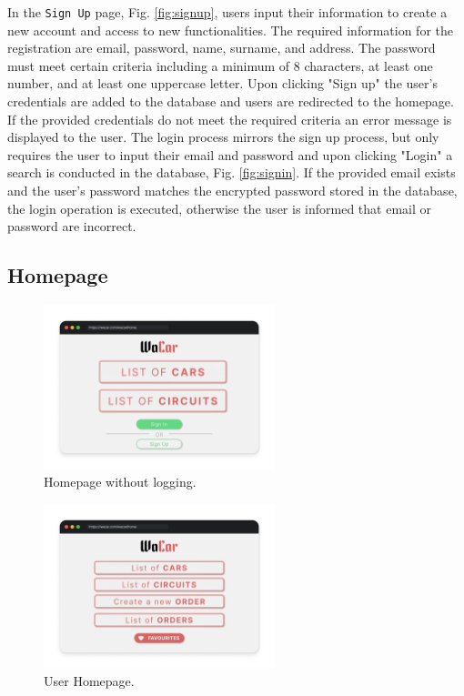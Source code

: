 In the \texttt{Sign Up} page, Fig. \ref{fig:signup}, users input their information to create a new account and access to new functionalities. The required information for the registration are email, password, name, surname, and address. The password must meet certain criteria including a minimum of 8 characters, at least one number, and at least one uppercase letter. Upon clicking "Sign up" the user's credentials are added to the database and users are redirected to the homepage. If the provided credentials do not meet the required criteria an error message is displayed to the user. The login process mirrors the sign up process, but only requires the user to input their email and password and upon clicking "Login" a search is conducted in the database, Fig. \ref{fig:signin}. If the provided email exists and the user's password matches the encrypted password stored in the database, the login operation is executed, otherwise the user is informed that email or password are incorrect.

\subsection{Homepage}

\begin{figure}[h]
    \centering
    \includegraphics[width=0.6\textwidth]{mockup/NoLogHome.png}
    \caption{Homepage without logging.}
    \label{fig:nologhome}
\end{figure}

\begin{figure}[h]
    \centering
    \includegraphics[width=0.6\textwidth]{mockup/UserHome.png}
    \caption{User Homepage.}
    \label{fig:usehome}
\end{figure}

